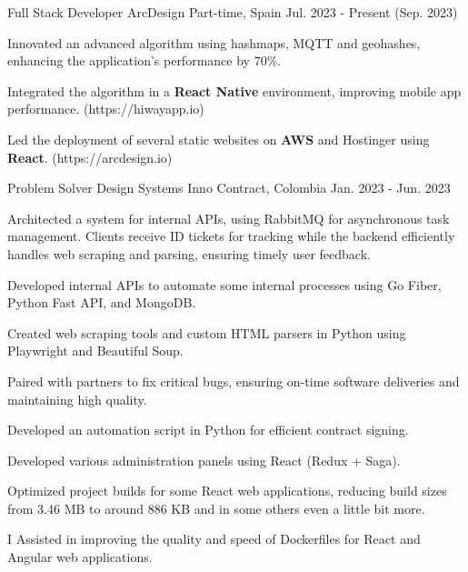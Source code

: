 \begin{cventries}
  \cventry
  {Full Stack Developer} %
  {ArcDesign} %
  {Part-time, Spain} %
  {Jul. 2023 - Present (Sep. 2023)} %
  {
    \begin{cvitems} %
      \item {Innovated an advanced algorithm using hashmaps, MQTT and geohashes, enhancing the application's performance by 70\%.}
      \item {Integrated the algorithm in a \textbf{React Native} environment, improving mobile app performance. (https://hiwayapp.io)}
      \item {Led the deployment of several static websites on \textbf{AWS} and Hostinger using \textbf{React}. (https://arcdesign.io)}
    \end{cvitems}
  }
  \cventry
  {Problem Solver} %
  {Design Systems Inno} %
  {Contract, Colombia} %
  {Jan. 2023 - Jun. 2023} %
  {
    \begin{cvitems} %
      \item {Architected a system for internal APIs, using RabbitMQ for asynchronous task management. Clients receive ID tickets for tracking while the backend efficiently handles web scraping and parsing, ensuring timely user feedback.}
      \item {Developed internal APIs to automate some internal processes using Go Fiber, Python Fast API, and MongoDB.}
      \item {Created web scraping tools and custom HTML parsers in Python using Playwright and Beautiful Soup.}
      \item {Paired with partners to fix critical bugs, ensuring on-time software deliveries and maintaining high quality.}
      \item {Developed an automation script in Python for efficient contract signing.}
      \item {Developed various administration panels using React (Redux + Saga).}
      \item {Optimized project builds for some React web applications, reducing build sizes from 3.46 MB to around 886 KB and in some others even a little bit more.}
      \item {I Assisted in improving the quality and speed of Dockerfiles for React and Angular web applications.}
    \end{cvitems}
  }


\end{cventries}
